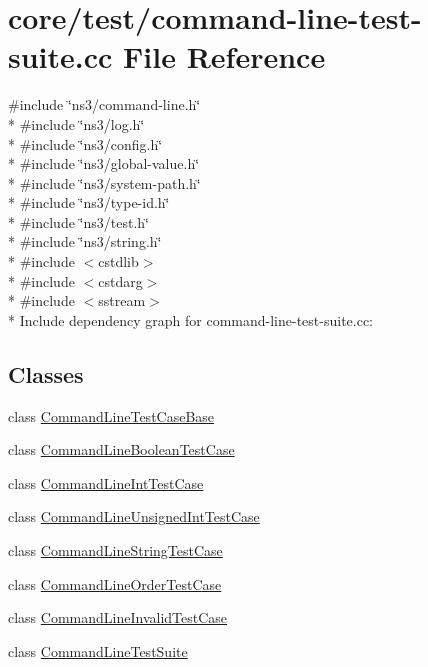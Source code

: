 \hypertarget{command-line-test-suite_8cc}{}\section{core/test/command-\/line-\/test-\/suite.cc File Reference}
\label{command-line-test-suite_8cc}
{\ttfamily \#include \char`\"{}ns3/command-\/line.\+h\char`\"{}}\\*
{\ttfamily \#include \char`\"{}ns3/log.\+h\char`\"{}}\\*
{\ttfamily \#include \char`\"{}ns3/config.\+h\char`\"{}}\\*
{\ttfamily \#include \char`\"{}ns3/global-\/value.\+h\char`\"{}}\\*
{\ttfamily \#include \char`\"{}ns3/system-\/path.\+h\char`\"{}}\\*
{\ttfamily \#include \char`\"{}ns3/type-\/id.\+h\char`\"{}}\\*
{\ttfamily \#include \char`\"{}ns3/test.\+h\char`\"{}}\\*
{\ttfamily \#include \char`\"{}ns3/string.\+h\char`\"{}}\\*
{\ttfamily \#include $<$cstdlib$>$}\\*
{\ttfamily \#include $<$cstdarg$>$}\\*
{\ttfamily \#include $<$sstream$>$}\\*
Include dependency graph for command-\/line-\/test-\/suite.cc\+:
\subsection*{Classes}
\begin{DoxyCompactItemize}
\item 
class \hyperlink{classCommandLineTestCaseBase}{Command\+Line\+Test\+Case\+Base}
\item 
class \hyperlink{classCommandLineBooleanTestCase}{Command\+Line\+Boolean\+Test\+Case}
\item 
class \hyperlink{classCommandLineIntTestCase}{Command\+Line\+Int\+Test\+Case}
\item 
class \hyperlink{classCommandLineUnsignedIntTestCase}{Command\+Line\+Unsigned\+Int\+Test\+Case}
\item 
class \hyperlink{classCommandLineStringTestCase}{Command\+Line\+String\+Test\+Case}
\item 
class \hyperlink{classCommandLineOrderTestCase}{Command\+Line\+Order\+Test\+Case}
\item 
class \hyperlink{classCommandLineInvalidTestCase}{Command\+Line\+Invalid\+Test\+Case}
\item 
class \hyperlink{classCommandLineTestSuite}{Command\+Line\+Test\+Suite}
\end{DoxyCompactItemize}
